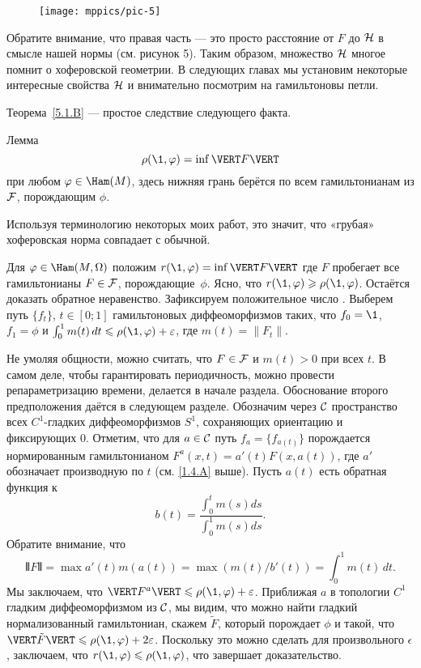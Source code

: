 \begin{figure}[ht!]
\vskip0mm
\centering
\texttt{[image: mppics/pic-5]}
\caption{}\label{pic-5}
\vskip0mm
\end{figure}

Обратите внимание, что правая часть --- это просто расстояние от $F$ до $\mathcal{H}$ в смысле нашей нормы (см. рисунок 5).
Таким образом, множество $\mathcal{H}$ многое помнит о хоферовской геометрии.
В следующих главах мы установим некоторые интересные свойства $\mathcal{H}$ и внимательно посмотрим на гамильтоновы петли.

Теорема~\ref{5.1.B} --- простое следствие следующего факта.

\begin{thm}{Лемма}\label{5.1.C}
\[\rho (\1, \phi) = \inf \VERT F \VERT\]
при любом $\phi \in \Ham (M)$, здесь нижняя грань берётся по всем гамильтонианам из $\mathcal{F}$, порождающим $\phi$.
\end{thm}

Используя терминологию некоторых моих работ, это значит, что «грубая» хоферовская норма совпадает с обычной.

Для $\phi \in \Ham (M, \Omega)$ положим $r (\1, \phi) \z= \inf \VERT F
\VERT$ где $F$ пробегает все гамильтонианы $F \in \mathcal{F}$,
порождающие~$\phi$. 
Ясно, что $r (\1, \phi) \ge \rho (\1, \phi)$.
Остаётся доказать обратное неравенство. 
Зафиксируем положительное число .
Выберем путь $\{f_t\}$, $t \in [0; 1]$ гамильтоновых диффеоморфизмов
таких, что $f_0 = \1$, $f_1 = \phi$ и  $\int_0^1 m (t)\,dt \le \rho
(\1, \phi) + \epsilon$, где $m (t) = \| F_t \|$.

Не умоляя общности, можно считать, что $F \in \mathcal{F}$ и $m (t)> 0$ при всех $t$.
В самом деле, чтобы гарантировать периодичность, можно провести
репараметризацию времени,  делается в начале раздела. 
Обоснование второго предположения даётся в следующем разделе.
Обозначим через $\mathcal{C}$ пространство всех $C^1$-гладких диффеоморфизмов
$S^1$, сохраняющих ориентацию и фиксирующих $0$. 
Отметим, что для $a \in \mathcal{C}$ путь $f_a = \{f_{a(t)}\}$ порождается
нормированным гамильтонианом $F^a (x, t) = a' (t) F (x, a(t))$, где
$a'$ обозначает производную по $t$ (см. \ref{1.4.A} выше). 
Пусть $a(t)$ есть обратная функция к 
\[b(t)
=
\frac{\int_0^t m(s)ds}{\int_0^1 m(s)ds}.\]
Обратите внимание, что 
\[\VERT F \VERT = \max a' (t) m (a (t)) = \max (m (t) / b'(t)) = \int_0^1m (t)\,dt.\]
Мы заключаем, что $\VERT F^a \VERT \le \rho (\1, \phi) + \epsilon$.
Приближая $a$ в топологии $C^1$ гладким диффеоморфизмом из $\mathcal{C}$, мы видим, что можно найти гладкий нормализованный гамильтониан, скажем $\tilde F$, который порождает $\phi$ и такой, что $\VERT \tilde F \VERT \le \rho (\1, \phi) + 2\epsilon$.
Поскольку это можно сделать для произвольного $\epsilon$, заключаем, что $r (\1, \phi) \le \rho (\1, \phi)$, что завершает доказательство.
\qeds

